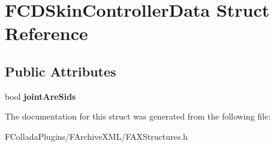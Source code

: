 \hypertarget{structFCDSkinControllerData}{
\section{FCDSkinControllerData Struct Reference}
\label{structFCDSkinControllerData}
}
\subsection*{Public Attributes}
\begin{DoxyCompactItemize}
\item 
\hypertarget{structFCDSkinControllerData_ab993b5ac3ec4897455bf8f1263ecc0ae}{
bool {\bfseries jointAreSids}}
\label{structFCDSkinControllerData_ab993b5ac3ec4897455bf8f1263ecc0ae}

\end{DoxyCompactItemize}


The documentation for this struct was generated from the following file:\begin{DoxyCompactItemize}
\item 
FColladaPlugins/FArchiveXML/FAXStructures.h\end{DoxyCompactItemize}
